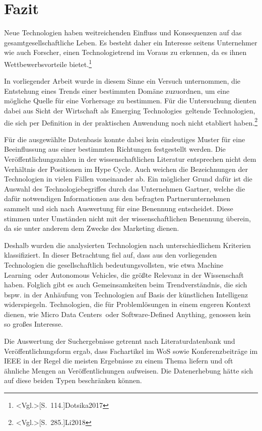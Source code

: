 \section{Fazit}
Neue Technologien haben weitreichenden Einfluss und Konsequenzen auf das ge\-samt\-ge\-sellschaftliche Leben. Es besteht daher ein Interesse seitens Unternehmer wie auch Forscher, einen Technologietrend im Voraus zu erkennen, da es ihnen Wettbewerbsvorteile bietet.\footnote{\citeNP<Vgl.>[S.~114.]{Dotsika2017}}

In vorliegender Arbeit wurde in diesem Sinne ein Versuch unternommen, die Entstehung eines Trends einer bestimmten Domäne zuzuordnen, um eine mögliche Quelle für eine Vorhersage zu bestimmen. Für die Untersuchung dienten dabei aus Sicht der Wirtschaft als \glqq Emerging Technologies\grqq~geltende Technologien, die sich per Definition in der praktischen Anwendung noch nicht etabliert haben.\footnote{\citeNP<Vgl.>[S.~285.]{Li2018}}

Für die ausgewählte Datenbasis konnte dabei kein eindeutiges Muster für eine Beeinflussung aus einer bestimmten Richtungen festgestellt werden. Die Ver\-öf\-fent\-li\-chungs\-zah\-len in der wissenschaftlichen Literatur entsprechen nicht dem Verhältnis der Positionen im \glqq Hype Cycle\grqq. Auch weichen die Bezeichnungen der Technologien in vielen Fällen voneinander ab. Ein möglicher Grund dafür ist die Auswahl des Technologiebegriffes durch das Unternehmen \glqq Gartner\grqq, welche die dafür notwendigen Informationen aus den befragten Partnerunternehmen sammelt und sich nach Auswertung für eine Benennung entscheidet. Diese stimmen unter Umständen nicht mit der wissenschaftlichen Benennung überein, da sie unter anderem dem Zwecke des Marketing dienen.

Deshalb wurden die analysierten Technologien nach unterschiedlichem Kriterien klassifiziert. In dieser Betrachtung fiel auf, dass aus den vorliegenden Technologien die gesellschaftlich bedeutungsvollsten, wie etwa \glqq Machine Learning\grqq~oder \glqq Autonomous Vehicles\grqq, die größte Relevanz in der Wissenschaft haben. Folglich gibt es auch Gemeinsamkeiten beim Trendverständnis, die sich bspw. in der Anhäufung von Technologien auf Basis der künstlichen Intelligenz widerspiegeln. Technologien, die für Problemlösungen in einem engeren Kontext dienen, wie \glqq Micro Data Centers\grqq~oder \glqq Software-Defined Anything\grqq, genossen kein so großes Interesse. 

Die Auswertung der Suchergebnisse getrennt nach Literaturdatenbank und Ver\-öf\-fent\-li\-chungs\-form ergab, dass Fachartikel im \ac{WoS} sowie Konferenzbeiträge im \ac{IEEE} in der Regel die meisten Ergebnisse zu einem Thema liefern und oft ähnliche Mengen an Veröffentlichungen aufweisen. Die Datenerhebung hätte sich auf diese beiden Typen beschränken können.

